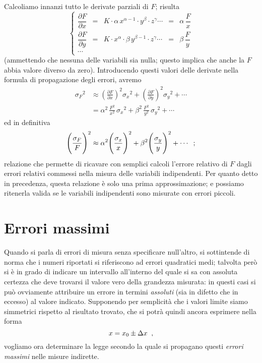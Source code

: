 Calcoliamo innanzi tutto le derivate parziali di $F$;
risulta
\begin{displaymath}
  \left \{ \begin{array}{rcccl}
    \dfrac{\partial F}{\partial x}
      & = & K \cdot \alpha \, x^{\alpha - 1} \cdot
        y^\beta \cdot z^\gamma\cdots
      & = & \alpha \, \dfrac{F}{x} \\[3ex]
    \dfrac{\partial F}{\partial y}
      & = & K \cdot x^\alpha \cdot \beta \, y^{\beta -
        1} \cdot z^\gamma\cdots
      & = & \beta \, \dfrac{F}{y} \\[3ex]
    \cdots & & & &
  \end{array} \right.
\end{displaymath}
(ammettendo che nessuna delle variabili sia nulla; questo
implica che anche la $F$ abbia valore diverso da zero).
Introducendo questi valori delle derivate nella formula di
propagazione degli errori, avremo
\begin{align*}
  {\sigma_F}^2 &\approx
    \left( \frac{\partial F}{\partial x} \right) ^2
    \! {\sigma_x}^2 +
    \left( \frac{\partial F}{\partial y} \right) ^2
    \! {\sigma_y}^2 +\cdots \\[1ex]
  &= \alpha^2 \, \frac{F^2}{x^2} \, {\sigma_x}^2 +
    \beta^2 \, \frac{F^2}{y^2} \, {\sigma_y}^2
    +\cdots
\end{align*}
ed in definitiva
\begin{equation*}
  \Biggl( \frac{\sigma_F}{ F } \Biggr) ^2
  \approx \alpha^2 \Biggl( \frac{\sigma_x}{ x }
  \Biggr) ^2 + \beta^2 \Biggl( \frac{\sigma_y}{ y
      } \Biggr) ^2 +\cdots \;\; ;
\end{equation*}
relazione che permette di ricavare con semplici calcoli
l'errore relativo di $F$ dagli errori relativi commessi
nella misura delle variabili indipendenti.  Per quanto detto
in precedenza, questa relazione \`e solo una prima
approssimazione; e possiamo ritenerla valida se le variabili
indipendenti sono misurate con errori piccoli.%

\section{Errori massimi}%
Quando si parla di errori di misura senza specificare
null'altro, si sottintende di norma che i numeri riportati
si riferiscono ad errori quadratici medi; talvolta per\`o si
\`e in grado di indicare un intervallo all'interno del quale
si sa con assoluta certezza che deve trovarsi il valore vero
della grandezza misurata: in questi casi si pu\`o ovviamente
attribuire un errore in termini \emph{assoluti} (sia in
difetto che in eccesso) al valore indicato.  Supponendo per
semplicit\`a che i valori limite siamo simmetrici rispetto
al risultato trovato, che si potr\`a quindi ancora esprimere
nella forma
\begin{equation*}
  x = x_0 \pm \Delta x \;\; ,
\end{equation*}
vogliamo ora determinare la legge secondo la quale si
propagano questi \emph{errori massimi} nelle misure
indirette.

